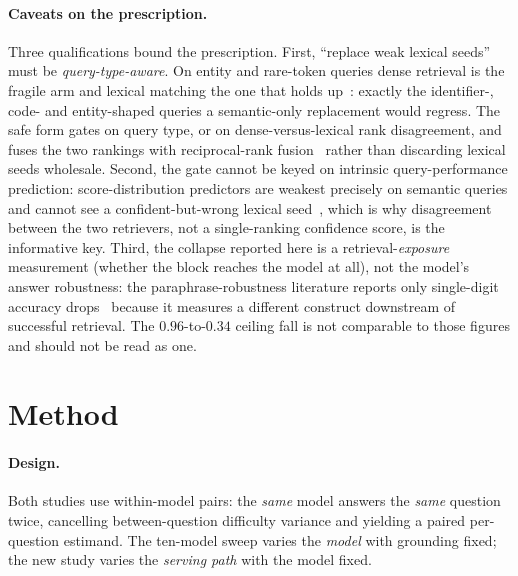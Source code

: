 \documentclass[10pt,twocolumn]{article}
\begin{document}
\paragraph{Caveats on the prescription.} Three qualifications bound the prescription. First, ``replace weak lexical seeds'' must be \emph{query-type-aware}. On entity and rare-token queries dense retrieval is the fragile arm and lexical matching the one that holds up~\cite{entityquestions2021}: exactly the identifier-, code- and entity-shaped queries a semantic-only replacement would regress. The safe form gates on query type, or on dense-versus-lexical rank disagreement, and fuses the two rankings with reciprocal-rank fusion~\cite{rrf2009} rather than discarding lexical seeds wholesale. Second, the gate cannot be keyed on intrinsic query-performance prediction: score-distribution predictors are weakest precisely on semantic queries and cannot see a confident-but-wrong lexical seed~\cite{qppneural2023}, which is why disagreement between the two retrievers, not a single-ranking confidence score, is the informative key. Third, the collapse reported here is a retrieval-\emph{exposure} measurement (whether the block reaches the model at all), not the model's answer robustness: the paraphrase-robustness literature reports only single-digit accuracy drops~\cite{benchrobust2025} because it measures a different construct downstream of successful retrieval. The $0.96$-to-$0.34$ ceiling fall is not comparable to those figures and should not be read as one.


\section{Method}\label{sec:method}
\paragraph{Design.} Both studies use within-model pairs: the \emph{same} model answers the \emph{same} question twice, cancelling between-question difficulty variance and yielding a paired per-question estimand. The ten-model sweep varies the \emph{model} with grounding fixed; the new study varies the \emph{serving path} with the model fixed.
\end{document}
